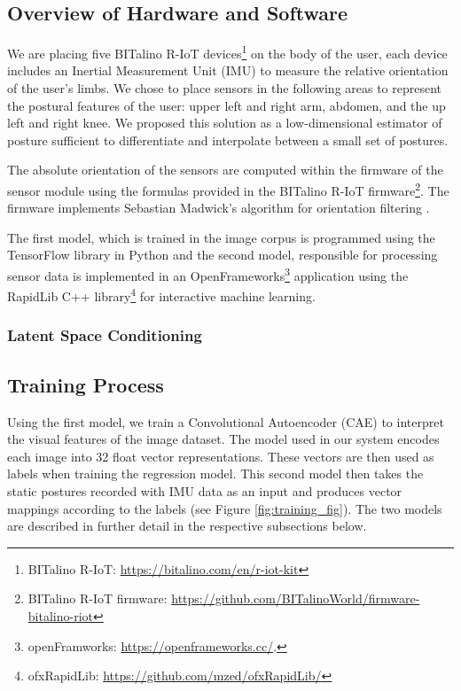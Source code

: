 \subsection{Overview of Hardware and Software}

We are placing five BITalino R-IoT devices\footnote{BITalino R-IoT: \url{https://bitalino.com/en/r-iot-kit}} on the body of the user, each device includes an Inertial Measurement Unit (IMU) to measure the relative orientation of the user’s limbs. We chose to place sensors in the following areas to represent the postural features of the user: upper left and right arm, abdomen, and the up left and right knee. We proposed this solution as a low-dimensional estimator of posture sufficient to differentiate and interpolate between a small set of postures.


The absolute orientation of the sensors are computed within the firmware of the sensor module using the formulas provided in the BITalino R-IoT firmware\footnote{BITalino R-IoT firmware: \url{https://github.com/BITalinoWorld/firmware-bitalino-riot}}. The firmware implements Sebastian Madwick’s algorithm for orientation filtering \cite{madgwick_ecient_nodate}.

The first model, which is trained in the image corpus is programmed using the TensorFlow library \cite{abadi_tensorflow_2016} in Python and the second model, responsible for processing sensor data is implemented in an OpenFrameworks\footnote{openFramworks: \url{https://openframeworks.cc/}.} application using the RapidLib C++ library\footnote{ofxRapidLib: \url{https://github.com/mzed/ofxRapidLib/}} for interactive machine learning.

\subsubsection{Latent Space Conditioning}



\subsection{Training Process}
\label{training_process}

Using the first model, we train a Convolutional Autoencoder (CAE) to interpret the visual features of the image dataset. The model used in our system encodes each image into 32 float vector representations. These vectors are then used as labels when training the regression model. This second model then takes the static postures recorded with IMU  data as an input and produces vector mappings according to the labels (see Figure \ref{fig:training_fig}). The two models are described in further detail in the respective subsections below.

